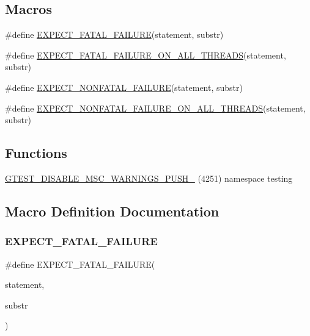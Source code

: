 \subsection*{Macros}
\begin{DoxyCompactItemize}
\item 
\#define \hyperlink{gtest-spi_8h_a819a3fd7f8b8cf24b6f1b3a26708973d}{E\+X\+P\+E\+C\+T\+\_\+\+F\+A\+T\+A\+L\+\_\+\+F\+A\+I\+L\+U\+RE}(statement,  substr)
\item 
\#define \hyperlink{gtest-spi_8h_ad8aac5bc859b2ddc07583636ae4f45cf}{E\+X\+P\+E\+C\+T\+\_\+\+F\+A\+T\+A\+L\+\_\+\+F\+A\+I\+L\+U\+R\+E\+\_\+\+O\+N\+\_\+\+A\+L\+L\+\_\+\+T\+H\+R\+E\+A\+DS}(statement,  substr)
\item 
\#define \hyperlink{gtest-spi_8h_a8376fd6821bd88fd806697355e79e138}{E\+X\+P\+E\+C\+T\+\_\+\+N\+O\+N\+F\+A\+T\+A\+L\+\_\+\+F\+A\+I\+L\+U\+RE}(statement,  substr)
\item 
\#define \hyperlink{gtest-spi_8h_a9f4cf1f150fe9facfc4cbf0bae646ee9}{E\+X\+P\+E\+C\+T\+\_\+\+N\+O\+N\+F\+A\+T\+A\+L\+\_\+\+F\+A\+I\+L\+U\+R\+E\+\_\+\+O\+N\+\_\+\+A\+L\+L\+\_\+\+T\+H\+R\+E\+A\+DS}(statement,  substr)
\end{DoxyCompactItemize}
\subsection*{Functions}
\begin{DoxyCompactItemize}
\item 
\hyperlink{gtest-spi_8h_a88f79832f9d045112a76e9da8611cc13}{G\+T\+E\+S\+T\+\_\+\+D\+I\+S\+A\+B\+L\+E\+\_\+\+M\+S\+C\+\_\+\+W\+A\+R\+N\+I\+N\+G\+S\+\_\+\+P\+U\+S\+H\+\_\+} (4251) namespace testing
\end{DoxyCompactItemize}


\subsection{Macro Definition Documentation}
\mbox{\label{gtest-spi_8h_a819a3fd7f8b8cf24b6f1b3a26708973d}} 
\subsubsection{\texorpdfstring{E\+X\+P\+E\+C\+T\+\_\+\+F\+A\+T\+A\+L\+\_\+\+F\+A\+I\+L\+U\+RE}{EXPECT\_FATAL\_FAILURE}}
{\footnotesize\ttfamily \#define E\+X\+P\+E\+C\+T\+\_\+\+F\+A\+T\+A\+L\+\_\+\+F\+A\+I\+L\+U\+RE(\begin{DoxyParamCaption}\item[{}]{statement,  }\item[{}]{substr }\end{DoxyParamCaption})}

